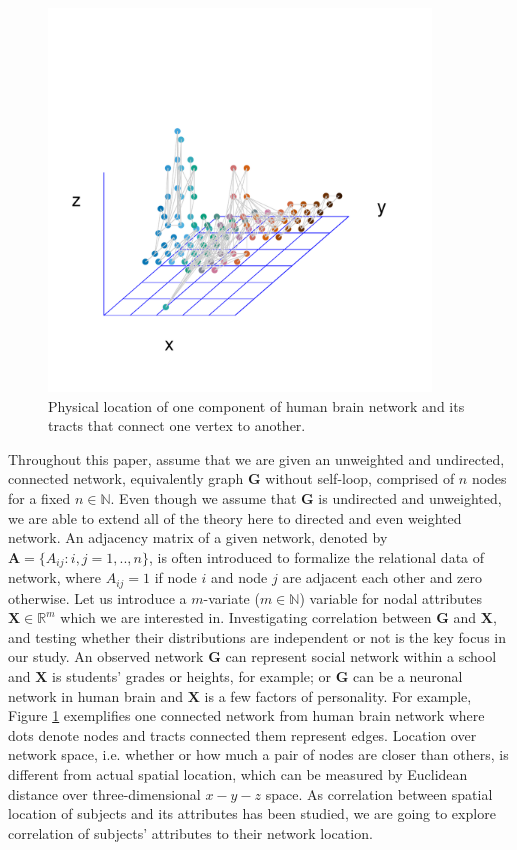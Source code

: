 \documentclass[12pt]{article}
\theoremstyle{definition}
\begin{document}
\begin{figure}[h]
	\centering
	\label{fig:intro}
	\includegraphics[width=4in]{../Figure/intro.pdf}	
	\caption{Physical location of one component of human brain network and its tracts that connect one vertex to another.}
\end{figure}

Throughout this paper, assume that we are given an unweighted and undirected, connected network, equivalently graph $\boldsymbol{G}$ without self-loop, comprised of $n$ nodes for a fixed $n \in \mathbb{N}$. Even though we assume that $\boldsymbol{G}$ is undirected and unweighted, we are able to extend all of the theory here to directed and even weighted network. An adjacency matrix of a given network, denoted by $\boldsymbol{A} = \{A_{ij} : i,j= 1,..,n \}$, is often introduced to formalize the relational data of network, where $A_{ij} = 1$ if node $i$ and node $j$ are adjacent each other and zero otherwise. Let us introduce a $m$-variate ($m \in \mathbb{N}$) variable for nodal attributes $\boldsymbol{X}  \in \mathbb{R}^{m}$ which we are interested in. Investigating correlation between $\boldsymbol{G}$ and $\boldsymbol{X}$, and testing whether their distributions are independent or not is the key focus in our study. An observed network $\mathbf{G}$ can represent social network within a school and $\boldsymbol{X}$ is students' grades or heights, for example; or $\mathbf{G}$ can be a neuronal network in human brain and $\boldsymbol{X}$ is a few factors of personality. For example, Figure \ref{fig:intro} exemplifies one connected network from human brain network where dots denote nodes and tracts connected them represent edges. Location over network space, i.e. whether or how much a pair of nodes are closer than others, is different from actual spatial location, which can be measured by Euclidean distance over three-dimensional $x-y-z$ space. As correlation between spatial location of subjects and its attributes has been studied, we are going to explore correlation of subjects' attributes to their network location. 
	
\end{document}
